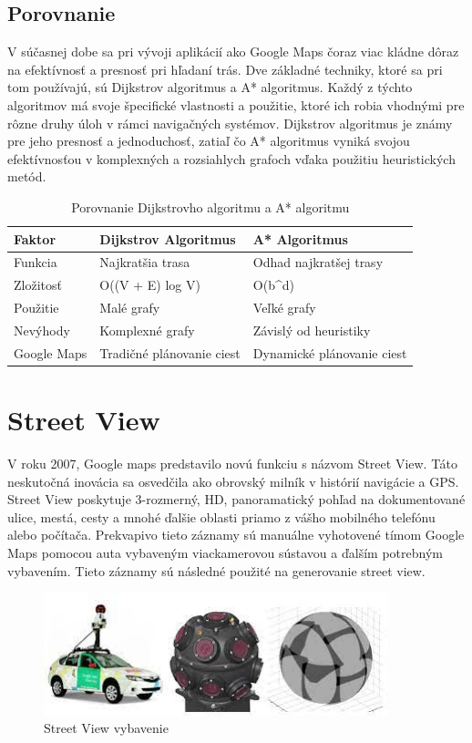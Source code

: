 \documentclass[10pt,slovak,a4paper]{article}
\begin{document}
\subsection{Porovnanie}
V súčasnej dobe sa pri vývoji aplikácií ako Google Maps čoraz viac kládne dôraz na efektívnosť a presnosť pri hľadaní trás. Dve základné techniky, ktoré sa pri tom používajú, sú Dijkstrov algoritmus a A* algoritmus. Každý z týchto algoritmov má svoje špecifické vlastnosti a použitie, ktoré ich robia vhodnými pre rôzne druhy úloh v rámci navigačných systémov. Dijkstrov algoritmus je známy pre jeho presnosť a jednoduchosť, zatiaľ čo A* algoritmus vyniká svojou efektívnosťou v komplexných a rozsiahlych grafoch vďaka použitiu heuristických metód.
\begin{table}[h]
\centering
\begin{tabular}{|l|l|l|}
\hline
\textbf{Faktor} & \textbf{Dijkstrov Algoritmus} & \textbf{A* Algoritmus} \\
\hline
Funkcia & Najkratšia trasa & Odhad najkratšej trasy \\
\hline
Zložitosť & O((V + E) log V) & O(b^d) \\
\hline
Použitie& Malé grafy & Veľké grafy \\
\hline
Nevýhody & Komplexné grafy & Závislý od heuristiky \\
\hline
 Google Maps & Tradičné plánovanie ciest & Dynamické plánovanie ciest \\
\hline
\end{tabular}
\caption{Porovnanie Dijkstrovho algoritmu a A* algoritmu}
\label{table:comparison}
\end{table}




\section{Street View}\label{Street}
V roku 2007, \cite{StreeView} Google maps predstavilo novú funkciu s názvom Street View. Táto neskutočná inovácia sa osvedčila ako obrovský milník v histórií navigácie a GPS. Street View poskytuje 3-rozmerný, HD, panoramatický pohľad na dokumentované ulice, mestá, cesty a mnohé ďalšie oblasti priamo z vášho mobilného telefónu alebo počítača. Prekvapivo tieto záznamy sú manuálne vyhotovené tímom Google Maps pomocou auta vybaveným viackamerovou sústavou a ďalším potrebným vybavením. Tieto záznamy sú následné použité na generovanie street view.
\begin{figure}
\centering
\includegraphics[width=10cm]{streetview.jpg}
\caption{Street View vybavenie}

\end{figure}
\end{document}
